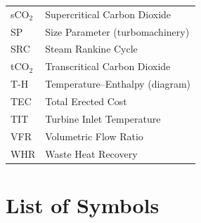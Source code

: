 \documentclass[12pt,a4paper]{report}
\begin{document}
\begin{longtable}{p{3.2cm} p{10.5cm}}
sCO$_2$ & Supercritical Carbon Dioxide \\
SP      & Size Parameter (turbomachinery) \\
SRC     & Steam Rankine Cycle \\
tCO$_2$ & Transcritical Carbon Dioxide \\
T-H     & Temperature--Enthalpy (diagram) \\
TEC     & Total Erected Cost \\
TIT     & Turbine Inlet Temperature \\
VFR     & Volumetric Flow Ratio \\
WHR     & Waste Heat Recovery \\
\end{longtable}

\clearpage

\chapter*{List of Symbols}
\end{document}
